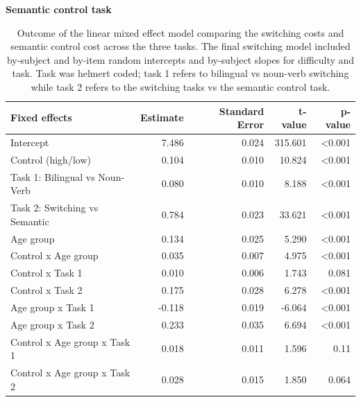 \documentclass[
]{article}
\begin{document}
\newpage

\textbf{Semantic control task}

\begin{table}[H]

\caption{\label{tab:TableS11}Outcome of the linear mixed effect model comparing the switching costs and semantic control cost across the three tasks. The final switching model included by-subject and by-item random intercepts and by-subject slopes for difficulty and task. Task was helmert coded; task 1 refers to bilingual vs noun-verb switching while task 2 refers to the switching tasks vs the semantic control task.}
\centering
\begin{tabular}[t]{lrrrr}
\toprule
Fixed effects & Estimate & Standard Error & t-value & p-value\\
\midrule
Intercept & 7.486 & 0.024 & 315.601 & <0.001\\
Control (high/low) & 0.104 & 0.010 & 10.824 & <0.001\\
Task 1: Bilingual vs Noun-Verb & 0.080 & 0.010 & 8.188 & <0.001\\
Task 2: Switching vs Semantic & 0.784 & 0.023 & 33.621 & <0.001\\
Age group & 0.134 & 0.025 & 5.290 & <0.001\\
\addlinespace
Control x Age group & 0.035 & 0.007 & 4.975 & <0.001\\
Control x Task 1 & 0.010 & 0.006 & 1.743 & 0.081\\
Control x Task 2 & 0.175 & 0.028 & 6.278 & <0.001\\
Age group x Task 1 & -0.118 & 0.019 & -6.064 & <0.001\\
Age group x Task 2 & 0.233 & 0.035 & 6.694 & <0.001\\
\addlinespace
Control x Age group x Task 1 & 0.018 & 0.011 & 1.596 & 0.11\\
Control x Age group x Task 2 & 0.028 & 0.015 & 1.850 & 0.064\\
\bottomrule
\end{tabular}
\end{table}
\end{document}
